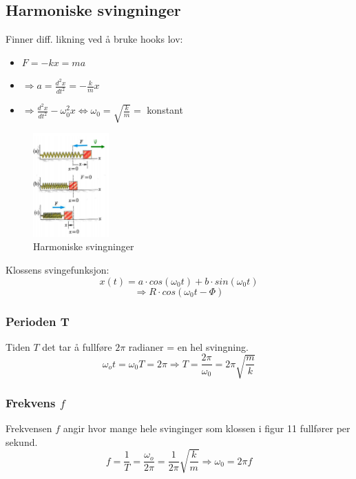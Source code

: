 \documentclass[12pt]{article}
\begin{document}
\subsection{Harmoniske svingninger}
Finner diff. likning ved å bruke hooks lov:
\begin{itemize}
    \item[] $F = -kx = ma$
    \item[] $\Rightarrow a = \frac{d^2x}{dt^2} = -\frac{k}{m}x$
    \item[] $\Rightarrow \frac{d^2x}{dt^2}-\omega_0^2x \Leftrightarrow \omega_0 = \sqrt{\frac{k}{m}} = $ konstant
\end{itemize}
\begin{figure} [H]
    \centering
    \includegraphics[height = 4cm]{images/swing.png}
    \caption{Harmoniske svingninger}
\end{figure}
Klossens svingefunksjon:
$$x(t) = a\cdot cos(\omega_0t) + b\cdot sin(\omega_0t)$$
$$\Rightarrow R \cdot cos(\omega_0t - \Phi)$$
\bigskip
\subsubsection{Perioden T}
Tiden $T$ det tar å  fullføre $2\pi$ radianer = en hel svingning.
$$\omega_ot = \omega_0T = 2\pi \Rightarrow T = \frac{2\pi}{\omega_0} = 2\pi \sqrt{\frac{m}{k}}$$


\subsubsection{Frekvens $f$}
Frekvensen $f$ angir hvor mange hele svinginger som klossen i figur 11 fullfører per sekund.
$$f = \frac{1}{T} = \frac{\omega_o}{2\pi} = \frac{1}{2\pi}\sqrt{\frac{k}{m}} \Rightarrow \omega_0 = 2\pi f$$
\end{document}
